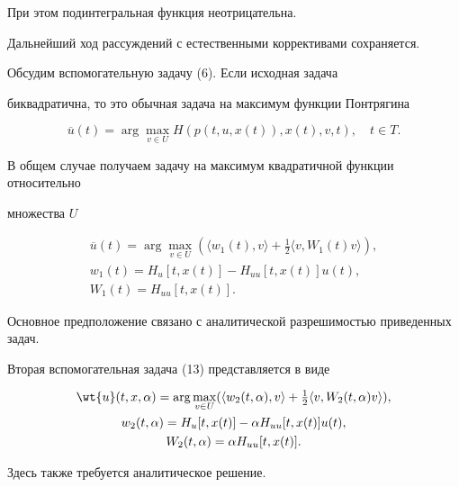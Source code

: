 При этом подинтегральная функция неотрицательна.


Дальнейший ход рассуждений с естественными коррективами сохраняется.





\begin{note}


Обсудим вспомогательную задачу (6). Если исходная задача 


биквадратична, то это обычная задача на максимум функции Понтрягина


$$


\overline{u}(t)=\arg\max_{v\in U}H(p(t,u,x(t)),x(t),v,t),\quad


t\in T.


$$


 


В общем случае получаем задачу на максимум квадратичной функции относительно 


множества $U$


\begin{gather*}


\overline{u}(t)=\arg\max_{v\in U}(\langle w_1(t),v\rangle +


\tfrac{1}{2}\langle v,W_1(t)v\rangle), \\


w_1(t)=H_u[t,x(t)]-H_{uu}[t,x(t)]u(t),\\


W_1(t)=H_{uu}[t,x(t)].


\end{gather*}


Основное предположение связано с аналитической разрешимостью приведенных задач.


\end{note}





\begin{note}


Вторая вспомогательная задача (13) представляется в виде


\begin{gather*}


\wt{u}(t,x,\alpha)=\arg\max_{v\in U}(\langle w_2(t,\alpha),v\rangle +


\tfrac{1}{2}\langle v,W_2(t,\alpha)v\rangle),\\


w_2(t,\alpha)=H_u[t,x(t)]-\alpha H_{uu}[t,x(t)]u(t),\\


W_2(t,\alpha)=\alpha H_{uu}[t,x(t)].


\end{gather*} 


Здесь также требуется аналитическое решение.


\end{note}








